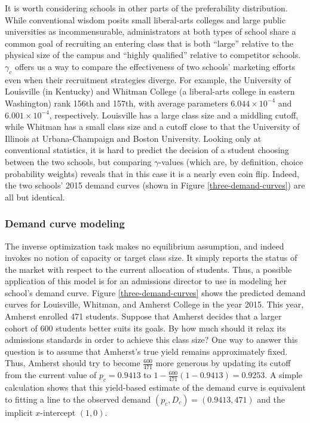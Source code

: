 \documentclass[12pt]{article}
\numberwithin{equation}{subsection}
\theoremstyle{definition}
\begin{document}
It is worth considering schools in other parts of the preferability distribution. While conventional wisdom posits small liberal-arts colleges and large public universities as incommensurable, administrators at both types of school share a common goal of recruiting an entering class that is both ``large'' relative to the physical size of the campus and ``highly qualified'' relative to competitor schools. $\gamma_c$ offers us a way to compare the effectiveness of two schools' marketing efforts even when their recruitment strategies diverge. For example, the University of Louisville (in Kentucky) and Whitman College (a liberal-arts college in eastern Washington) rank 156th and 157th, with average parameters $6.044 \times 10^{-4}$ and $6.001 \times 10^{-4}$, respectively. Louisville has a large class size and a middling cutoff, while Whitman has a small class size and a cutoff close to that the University of Illinois at Urbana-Champaign and Boston University. Looking only at conventional statistics, it is hard to predict the decision of a student choosing between the two schools, but comparing $\gamma$-values (which are, by definition, choice probability weights) reveals that in this case it is a nearly even coin flip. Indeed, the two schools' 2015 demand curves (shown in Figure \ref{three-demand-curves}) are all but identical. 

\subsubsection{Demand curve modeling}
The inverse optimization task makes no equilibrium assumption, and indeed invokes no notion of capacity or target class size. It simply reports the status of the market with respect to the current allocation of students. Thus, a possible application of this model is for an admissions director to use in modeling her school's demand curve. Figure \ref{three-demand-curves} shows the predicted demand curves for Louisville, Whitman, and Amherst College in the year 2015. This year, Amherst enrolled 471 students. Suppose that Amherst decides that a larger cohort of 600 students better suits its goals. By how much should it relax its admissions standards in order to achieve this class size? One way to answer this question is to assume that Amherst's true yield remains approximately fixed. Thus, Amherst should try to become $\frac{600}{471}$ more generous by updating its cutoff from the current value of $p_c = 0.9413$ to $1 - \frac{600}{471}(1 - 0.9413) = 0.9253$. A simple calculation shows that this yield-based estimate of the demand curve is equivalent to fitting a line to the observed demand $(p_c, D_c) = (0.9413, 471)$ and the implicit $x$-intercept $(1, 0)$. 
\end{document}
